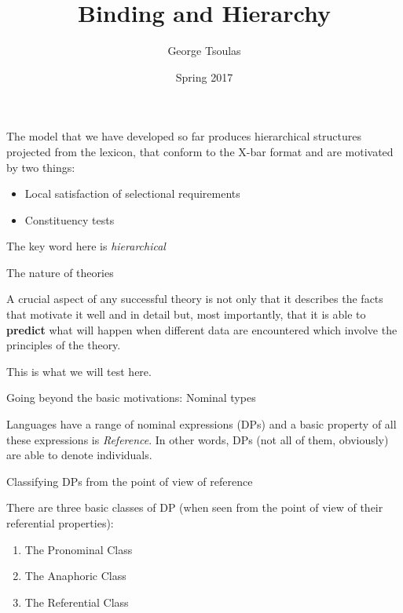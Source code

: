 


\title{Binding and Hierarchy}
\date{Spring 2017}
\author{George Tsoulas}


\maketitle


\begin{frame}
  The model that we have developed so far produces hierarchical structures projected from the lexicon, that conform to the X-bar format and are motivated by two things:
  \begin{itemize}
  \item Local satisfaction of selectional requirements
  \item Constituency tests
  \end{itemize}
\pause
The key word here is \textit{hierarchical}
\end{frame}

\begin{frame}
{The nature of theories}

A crucial aspect of any successful theory is not only that it describes the facts that motivate it well and in detail but, most importantly, that it is able to \textbf{predict} what will happen when different data are encountered which involve the principles of the theory.

\pause

This is what we will test here.

\end{frame}


\begin{frame}
  {Going beyond the basic motivations:  Nominal types}


Languages have a range of nominal expressions (DPs) and a basic property of all these expressions is \textit{Reference}.  In other words, DPs (not all of them, obviously) are able to denote individuals.

\end{frame}

\begin{frame}
  {Classifying DPs from the point of view of reference}

There are three basic classes of DP (when seen from the point of view of their referential properties):

\begin{enumerate}
\item The Pronominal Class \pause
\item The Anaphoric Class \pause
\item The Referential Class \pause
\end{enumerate}

\end{frame}



